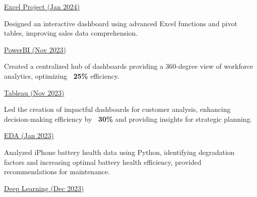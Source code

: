 \documentclass[]{awesome-cv}
\begin{document}
\begin{cventries}
	{\href{https://k-ashik.github.io/Khalid-The-Data-Analyst.github.io/}{Excel Project (Jan 2024)}}
	{\begin{cvitems}
		\item {Designed an interactive dashboard using advanced Excel functions and pivot tables, improving sales data comprehension.}
	\end{cvitems}}
	{\href{https://www.novypro.com/profile_projects/khalid-md-ashik}{PowerBI (Nov 2023)}}
	{\begin{cvitems}
		\item {Created a centralized hub of dashboards providing a 360-degree view of workforce analytics, optimizing \textbf{~{}25\%} efficiency. } 
	\end{cvitems}}
	{\href{https://public.tableau.com/app/profile/khalid.md.ashik/vizzes}{Tableau (Nov 2023)}}
	{\begin{cvitems}
		\item {Led the creation of impactful dashboards for customer analysis, enhancing decision-making efficiency by \textbf{~{}30\%} and providing insights for strategic planning.}
		\end{cvitems}}
	{\href{https://github.com/K-Ashik/Investigating-Battery-Health-Issues-in-iPhone-Models-An-Analysis-of-Charging-Patterns-and-iOS-Update}{EDA (Jan 2023)}}
	{\begin{cvitems}
		\item {Analyzed iPhone battery health data using Python, identifying degradation factors and increasing optimal battery health efficiency, provided recommendations for maintenance.}
	\end{cvitems}}
	{\href{https://k-ashik.github.io/Khalid-The-Data-Analyst.github.io/}{Deep Learning (Dec 2023)}}

\end{cventries}
\end{document}

